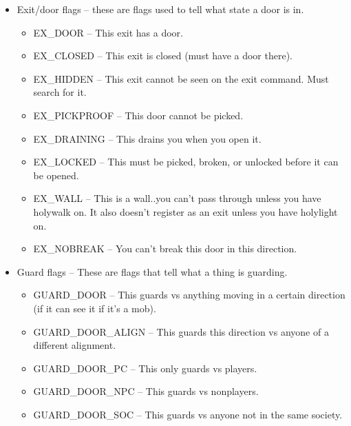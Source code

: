\begin{itemize}

\item Exit/door flags -- these are flags used to tell what state a door is in.

\begin{itemize}

\item EX\_DOOR -- This exit has a door.

\item EX\_CLOSED -- This exit is closed (must have a door there).

\item EX\_HIDDEN -- This exit cannot be seen on the exit command. Must search for it.

\item EX\_PICKPROOF -- This door cannot be picked.


\item EX\_DRAINING -- This drains you when you open it.

\item EX\_LOCKED -- This must be picked, broken, or unlocked before it can be opened.

\item EX\_WALL -- This is a wall..you can't pass through unless you have holywalk on. It also doesn't register as an exit unless you have holylight on.

\item EX\_NOBREAK -- You can't break this door in this direction.

\end{itemize}


\item Guard flags -- These are flags that tell what a thing is guarding.

\begin{itemize}

\item GUARD\_DOOR -- This guards vs anything moving in a certain direction (if it can see it if it's a mob).

\item GUARD\_DOOR\_ALIGN -- This guards this direction vs anyone of a different alignment.

\item GUARD\_DOOR\_PC -- This only guards vs players.

\item GUARD\_DOOR\_NPC -- This guards vs nonplayers.

\item GUARD\_DOOR\_SOC -- This guards vs anyone not in the same society.


\end{itemize}
\end{itemize}
